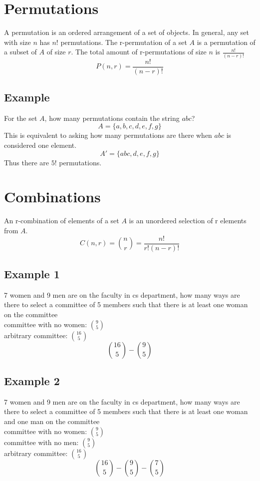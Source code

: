 \documentclass{article}
\theoremstyle{mytheoremstyle}
\theoremstyle{mytheoremstyle}
\theoremstyle{myproblemstyle}
\begin{document}
    \section*{Permutations}
    A permutation is an ordered arrangement of a set of objects. In general, any
    set with size $n$ has $n!$ permutations. The r-permutation of a set $A$ is a
    permutation of a subset of $A$ of size $r$. The total amount of
    r-permutations of size $n$ is $\frac{n!}{(n-r)!}$
    \[
        P(n,r) = \frac{n!}{(n-r)!}
    \]

    \subsection*{Example}
    For the set $A$, how many permutations contain the string
    $abc$?
    \[
        A=\{a,b,c,d,e,f,g\}
    \]
    This is equivalent to asking how many permutations are there when $abc$ is
    considered one element.
    \[
        A' = \{abc,d,e,f,g\}
    \]
    Thus there are $5!$ permutations.

    \section*{Combinations}
    An r-combination of elements of a set $A$ is an unordered selection of r
    elements from $A$.
    \[
        C(n,r) = \binom{n}{r} = \frac{n!}{r!(n-r)!}
    \]

    \subsection*{Example 1}
    7 women and 9 men are on the faculty in cs department, how many ways are
    there to select a committee of 5 members such that there is at least one
    woman on the committee \\
    committee with no women: $\binom{9}{5}$ \\
    arbitrary committee: $\binom{16}{5}$
    \[
        \binom{16}{5} - \binom{9}{5}
    \]

    \subsection*{Example 2}
    7 women and 9 men are on the faculty in cs department, how many ways are
    there to select a committee of 5 members such that there is at least one
    woman and one man on the committee \\
    committee with no women: $\binom{9}{5}$ \\
    committee with no men: $\binom{9}{5}$ \\
    arbitrary committee: $\binom{16}{5}$
    \[
        {\binom{16}{5}} - {\binom{9}{5}} - {\binom{7}{5}}
    \]
\end{document}
